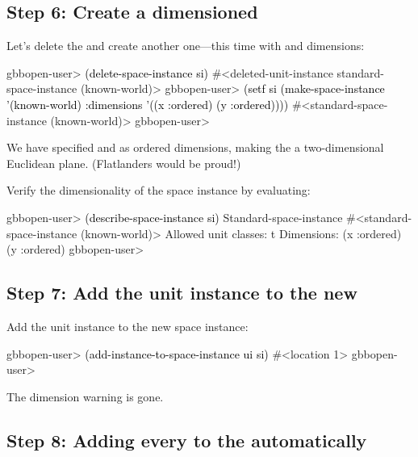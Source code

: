 \documentclass[10pt,twoside,english,pdftex]{article}
\begin{document}
\subsection*{Step 6: Create a dimensioned }

%
%
%
Let's delete the  and create another one---this time
with  and  dimensions:
%
\W\supp
\begin{example}
\textcolor{darkergray}{%
  gbbopen-user> \textcolor{black}{(delete-space-instance si)}
  #<deleted-unit-instance standard-space-instance (known-world)>
  gbbopen-user> \textcolor{black}{(setf si (make-space-instance '(known-world)
              :dimensions '((x :ordered) (y :ordered))))}
  #<standard-space-instance (known-world)>
  gbbopen-user>}
\end{example}
%
We have specified  and  as ordered dimensions, making the
 a two-dimensional Euclidean plane.  (Flatlanders
would be proud!)

%
%
Verify the dimensionality of the  space instance by
evaluating:
%
\W\supp
\begin{example}
\textcolor{darkergray}{%
  gbbopen-user> \textcolor{black}{(describe-space-instance si)}
  Standard-space-instance #<standard-space-instance (known-world)>
    Allowed unit classes: t
    Dimensions:
      (x :ordered)
      (y :ordered)
  gbbopen-user>}
\end{example}

\subsection*{Step 7: Add the  unit instance to the new
  }

%
%
Add the  unit instance to the new 
space instance:
%
\W\supp
\begin{example}
\textcolor{darkergray}{%
  gbbopen-user> \textcolor{black}{(add-instance-to-space-instance ui si)}
  #<location 1>
  gbbopen-user>}
\end{example}
%
The dimension warning is gone.

\subsection*{Step 8: Adding every  to the 
  automatically}
\end{document}
